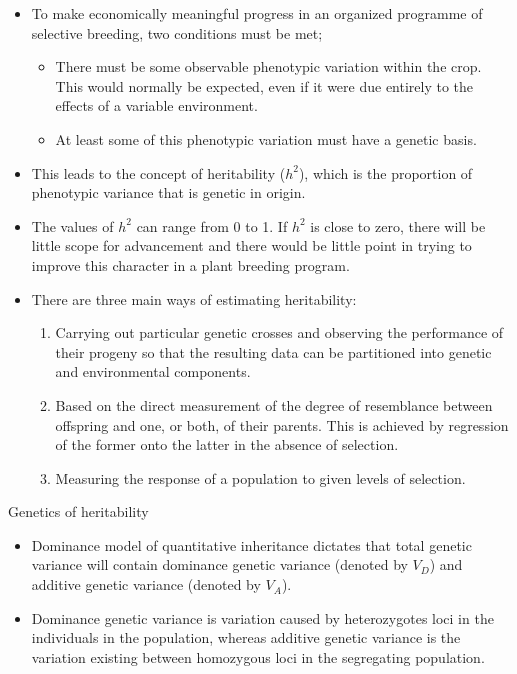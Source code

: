 \documentclass[11pt,dvipsnames,ignorenonframetext,aspectratio=169]{beamer}
\providecommand{\tightlist}{%
  \setlength{\itemsep}{0pt}\setlength{\parskip}{0pt}}
\begin{document}
\begin{frame}{}
\protect\hypertarget{section-16}{}
\begin{itemize}
\tightlist
\item
  To make economically meaningful progress in an organized programme of
  selective breeding, two conditions must be met;

  \begin{itemize}
  \tightlist
  \item
    There must be some observable phenotypic variation within the crop.
    This would normally be expected, even if it were due entirely to the
    effects of a variable environment.
  \item
    At least some of this phenotypic variation must have a genetic
    basis.
  \end{itemize}
\item
  This leads to the concept of heritability (\(h^2\)), which is the
  proportion of phenotypic variance that is genetic in origin.
\item
  The values of \(h^2\) can range from 0 to 1. If \(h^2\) is close to
  zero, there will be little scope for advancement and there would be
  little point in trying to improve this character in a plant breeding
  program.
\item
  There are three main ways of estimating heritability:

  \begin{enumerate}
  \tightlist
  \item
    Carrying out particular genetic crosses and observing the
    performance of their progeny so that the resulting data can be
    partitioned into genetic and environmental components.
  \item
    Based on the direct measurement of the degree of resemblance between
    offspring and one, or both, of their parents. This is achieved by
    regression of the former onto the latter in the absence of
    selection.
  \item
    Measuring the response of a population to given levels of selection.
  \end{enumerate}
\end{itemize}
\end{frame}

\begin{frame}{Genetics of heritability}
\protect\hypertarget{genetics-of-heritability}{}
\begin{itemize}
\tightlist
\item
  Dominance model of quantitative inheritance dictates that total
  genetic variance will contain dominance genetic variance (denoted by
  \(V_D\)) and additive genetic variance (denoted by \(V_A\)).
\item
  Dominance genetic variance is variation caused by heterozygotes loci
  in the individuals in the population, whereas additive genetic
  variance is the variation existing between homozygous loci in the
  segregating population.
\end{itemize}
\end{frame}
\end{document}

